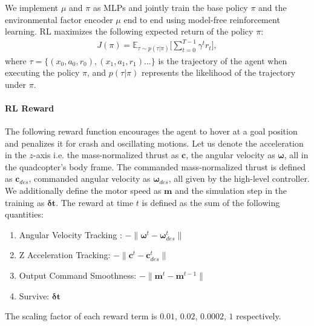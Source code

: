 
We implement $\mu$ and $\pi$ as MLPs and jointly train the base policy $\pi$ and the environmental factor encoder $\mu$ end to end using model-free reinforcement learning. RL maximizes the following expected return of the policy $\pi$: 
\begin{align}
    J(\pi) = \mathbb{E}_{\tau \sim p(\tau|\pi)}\Bigg[\sum_{t=0}^{T-1}\gamma^t r_t\Bigg],
\end{align}
where $\tau = \{(x_0, a_0, r_0), (x_1, a_1, r_1) . . .\}$ is the trajectory of the agent when executing the policy $\pi$, and $p(\tau|\pi)$ represents the likelihood of the trajectory under $\pi$.

\paragraph{RL Reward} The following reward function encourages the agent to hover at a goal position and penalizes it for crash and oscillating motions. Let us denote the acceleration in the $z$-axis i.e. the mass-normalized thrust as $\mathbf{c}$, the angular velocity as $\bm{\omega}$, all in the quadcopter's body frame. The commanded mass-normalized thrust is defined as $\bm{c}_{des}$, commanded angular velocity as $\bm{\omega}_{des}$, all given by the high-level controller.
We additionally define the motor speed as $\bm{m}$ and the simulation step in the training as $\bm{\delta t}$. The reward at time $t$ is defined as the sum of the following quantities:
\begin{enumerate}
    \item Angular Velocity Tracking : $-\| \bm{\omega}^{t} - \bm{\omega}_{des}^{t} \|$
    \item Z Acceleration Tracking: $-\| \mathbf{c}^{t} - \mathbf{c}_{des}^{t} \|$
    \item Output Command Smoothness: $-\| \bm{m}^{t} - \bm{m}^{t-1} \|$
    \item Survive: $\bm{\delta t}$
\end{enumerate}
The scaling factor of each reward term is $0.01$, $0.02$, $0.0002$, $1$ respectively. 

